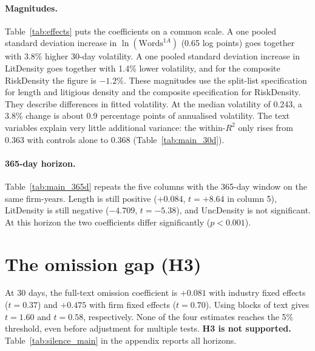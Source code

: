 \paragraph{Magnitudes.} Table~\ref{tab:effects} puts the coefficients on a
common scale. A one pooled standard deviation increase in
$\ln(\text{Words}^{1A})$ (0.65 log points) goes together with 3.8\% higher
30-day volatility. A one pooled standard deviation increase in LitDensity
goes together with 1.4\% lower volatility, and for the composite RiskDensity
the figure is $-1.2\%$. These magnitudes use the split-list specification 
for length and litigious density and the composite specification for RiskDensity. 
They describe differences in fitted volatility. At the median
volatility of 0.243, a 3.8\% change is about 0.9 percentage points of
annualised volatility. The text variables explain very little additional
variance: the within-$R^2$ only rises from 0.363 with controls alone to 0.368
(Table~\ref{tab:main_30d}).



\paragraph{365-day horizon.} Table~\ref{tab:main_365d} repeats the five
columns with the 365-day window on the same firm-years. Length is still
positive ($+0.084$, $t = +8.64$ in column 5), LitDensity is still negative
($-4.709$, $t = -5.38$), and UncDensity is not significant. At this horizon
the two coefficients differ significantly
($p < 0.001$).




\section{The omission gap (H3)}
\label{sec:silence_results}

At 30 days, the full-text omission coefficient is $+0.081$ with industry fixed effects ($t=0.37$) and $+0.475$ with firm fixed effects ($t=0.70$). Using blocks of text gives $t=1.60$ and $t=0.58$, respectively. None of the four estimates reaches the 5\% threshold, even before adjustment for multiple tests. \textbf{H3 is not supported.} Table~\ref{tab:silence_main} in the appendix reports all horizons.
